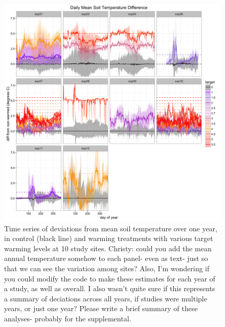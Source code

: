 \documentclass{article}
\begin{document}
 \begin{figure}[h]
     \centering
 \includegraphics{../figures/Exploratory_TimeSeries_SoilTemp1Mean_Deviation.png}    
 \caption{Time series of deviations from mean soil temperature over one year, in control (black line) and warming treatments with various target warming levels at 10 study sites. Christy: could you add the mean annual temperature somehow to each panel- even as text- just so that we can see the variation among sites? Also, I'm wondering if you could modify the code to make these estimates for each year of a study, as well as overall. I also wasn't quite sure if this represents a summary of deciations across all years, if studies were multiple years, or just one year? Please write a brief summary of these analyses- probably for the supplemental.} 
 \end{figure}
\clearpage
\end{document}

